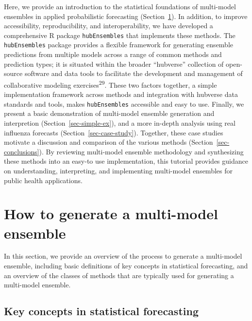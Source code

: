 \documentclass[
  letterpaper,
  DIV=11,
  numbers=noendperiod]{scrartcl}
\begin{document}
Here, we provide an introduction to the statistical foundations of
multi-model ensembles in applied probabilistic forecasting
(Section~\ref{sec-defs}). In addition, to improve accessibility,
reproducibility, and interoperability, we have developed a comprehensive
R package \texttt{hubEnsembles} that implements these methods. The
\texttt{hubEnsembles} package provides a flexible framework for
generating ensemble predictions from multiple models across a range of
common methods and prediction types; it is situated within the broader
``hubverse'' collection of open-source software and data tools to
facilitate the development and management of collaborative modeling
exercises\textsuperscript{29}. These two factors together, a simple
implementation framework across methods and integration with hubverse
data standards and tools, makes \texttt{hubEnsembles} accessible and
easy to use. Finally, we present a basic demonstration of multi-model
ensemble generation and interpretion (Section~\ref{sec-simple-ex}), and
a more in-depth analysis using real influenza forecasts
(Section~\ref{sec-case-study}). Together, these case studies motivate a
discussion and comparison of the various methods
(Section~\ref{sec-conclusions}). By reviewing multi-model ensemble
methodology and synthesizing these methods into an easy-to use
implementation, this tutorial provides guidance on understanding,
interpreting, and implementing multi-model ensembles for public health
applications.

\section{How to generate a multi-model ensemble}\label{sec-defs}

In this section, we provide an overview of the process to generate a
multi-model ensemble, including basic definitions of key concepts in
statistical forecasting, and an overview of the classes of methods that
are typically used for generating a multi-model ensemble.

\subsection{Key concepts in statistical
forecasting}\label{key-concepts-in-statistical-forecasting}
\end{document}
